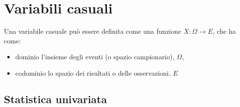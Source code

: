 
\chapter{Variabili casuali}
\begin{definition}
\end{definition}
\begin{definition}
\end{definition}
\begin{definition}
\end{definition}
\begin{definition}
\end{definition}
\begin{definition}
    Una variabile casuale può essere definita come una funzione $X: \Omega \rightarrow E$, che ha come:
    \begin{itemize}
        \item dominio l'insieme degli eventi (o spazio campionario), $\Omega$,
        \item codominio lo spazio dei risultati o delle osservazioni, $E$
    \end{itemize}
\end{definition}
\section{Statistica univariata}

